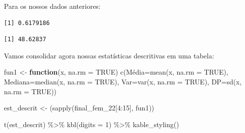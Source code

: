 \documentclass[
  letterpaper,
  DIV=11,
  numbers=noendperiod]{scrreprt}
\newenvironment{Shaded}{\begin{snugshade}}{\end{snugshade}}
\newcommand{\AttributeTok}[1]{\textcolor[rgb]{0.40,0.45,0.13}{#1}}
\newcommand{\CommentTok}[1]{\textcolor[rgb]{0.37,0.37,0.37}{#1}}
\newcommand{\ConstantTok}[1]{\textcolor[rgb]{0.56,0.35,0.01}{#1}}
\newcommand{\ControlFlowTok}[1]{\textcolor[rgb]{0.00,0.23,0.31}{\textbf{#1}}}
\newcommand{\DecValTok}[1]{\textcolor[rgb]{0.68,0.00,0.00}{#1}}
\newcommand{\FunctionTok}[1]{\textcolor[rgb]{0.28,0.35,0.67}{#1}}
\newcommand{\NormalTok}[1]{\textcolor[rgb]{0.00,0.23,0.31}{#1}}
\newcommand{\OtherTok}[1]{\textcolor[rgb]{0.00,0.23,0.31}{#1}}
\newcommand{\SpecialCharTok}[1]{\textcolor[rgb]{0.37,0.37,0.37}{#1}}
\begin{document}
Para os nossos dados anteriores:

\begin{Shaded}
\end{Shaded}

\begin{verbatim}
[1] 0.6179186
\end{verbatim}

\begin{Shaded}
\end{Shaded}

\begin{verbatim}
[1] 48.62837
\end{verbatim}

Vamos consolidar agora nossas estatísticas descritivas em uma tabela:

\begin{Shaded}
\begin{Highlighting}[]
\NormalTok{fun1 }\OtherTok{\textless{}{-}} \ControlFlowTok{function}\NormalTok{(x, }\AttributeTok{na.rm =} \ConstantTok{TRUE}\NormalTok{) }\FunctionTok{c}\NormalTok{(Média}\OtherTok{=}\FunctionTok{mean}\NormalTok{(x, }\AttributeTok{na.rm =} \ConstantTok{TRUE}\NormalTok{), }\AttributeTok{Mediana=}\FunctionTok{median}\NormalTok{(x, }\AttributeTok{na.rm =} \ConstantTok{TRUE}\NormalTok{), }\AttributeTok{Var=}\FunctionTok{var}\NormalTok{(x, }\AttributeTok{na.rm =} \ConstantTok{TRUE}\NormalTok{), }\AttributeTok{DP=}\FunctionTok{sd}\NormalTok{(x, }\AttributeTok{na.rm =} \ConstantTok{TRUE}\NormalTok{))}

\NormalTok{est\_descrit }\OtherTok{\textless{}{-}}\NormalTok{ (}\FunctionTok{sapply}\NormalTok{(final\_fem\_22[}\DecValTok{4}\SpecialCharTok{:}\DecValTok{15}\NormalTok{], fun1))}

\FunctionTok{t}\NormalTok{(est\_descrit) }\SpecialCharTok{\%\textgreater{}\%} 
  \FunctionTok{kbl}\NormalTok{(}\AttributeTok{digits =} \DecValTok{1}\NormalTok{) }\SpecialCharTok{\%\textgreater{}\%}
     \FunctionTok{kable\_styling}\NormalTok{()}
\end{Highlighting}
\end{Shaded}
\end{document}
